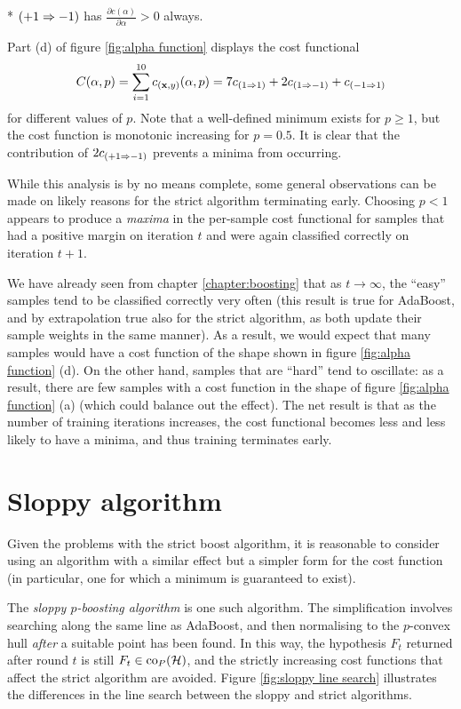 * $(+1 \Rightarrow -1)$ has $\frac{\partial c(\alpha)}{\partial \alpha} > 0$
  always.

Part (d) of figure \ref{fig:alpha function} displays the cost
functional 
\begin{equation}
C(\alpha,p) = \sum_{i=1}^{10} c_{(\mathbf{x}, y)}(\alpha, p) 
= 7c_{(1 \Rightarrow 1)} + 2c_{(1 \Rightarrow -1)} + c_{(-1 \Rightarrow 1)}
\end{equation}
for different values of $p$.  Note that a well-defined minimum exists
for $p \geq 1$, but the cost function is monotonic increasing for $p =
0.5$.  It is clear that the contribution of $2c_{(+1 \Rightarrow -1)}$
prevents a minima from occurring.

While this analysis is by no means complete, some general observations
can be made on likely reasons for the strict algorithm terminating
early.  Choosing $p < 1$ appears to produce a \emph{maxima} in the
per-sample cost functional for samples that had a positive margin on
iteration $t$ and were again classified correctly on iteration $t+1$.

We have already seen from chapter \ref{chapter:boosting} that as $t
\rightarrow \infty$, the ``easy'' samples tend to be classified
correctly very often (this result is true for AdaBoost, and by
extrapolation true also for the strict algorithm, as both update their
sample weights in the same manner).  As a result, we would expect that
many samples would have a cost function of the shape shown in figure
\ref{fig:alpha function} (d).  On the other hand, samples that are
``hard'' tend to oscillate: as a result, there are few samples with a
cost function in the shape of figure \ref{fig:alpha function} (a)
(which could balance out the effect).  The net result is that as the
number of training iterations increases, the cost functional becomes
less and less likely to have a minima, and thus training terminates
early.

\section{Sloppy algorithm}

Given the problems with the strict boost algorithm, it is reasonable
to consider using an algorithm with a similar effect but a simpler
form for the cost function (in particular, one for which a minimum is
guaranteed to exist).

The \emph{sloppy $p$-boosting algorithm} is one such algorithm.  The
simplification involves searching along the same line as AdaBoost, and
then normalising to the $p$-convex hull \emph{after} a suitable point
has been found.  In this way, the hypothesis $F_t$ returned after
round $t$ is still $F_t \in \mathrm{co}_P(\mathcal{H})$, and the strictly increasing
cost functions that affect the strict algorithm are avoided.  Figure
\ref{fig:sloppy line search} illustrates the differences in the line
search between the sloppy and strict algorithms.

